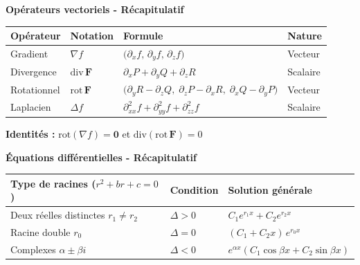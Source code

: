 \documentclass[11pt,a4paper]{article}
\begin{document}
\begin{methodebox}
\textbf{Opérateurs vectoriels - Récapitulatif}
\begin{center}
\begin{tabular}{@{}llll@{}}
\toprule
Opérateur & Notation & Formule & Nature \\
\midrule
Gradient   & $\nabla f$               & $\bigl(\partial_x f,\,\partial_y f,\,\partial_z f\bigr)$                                         & Vecteur \\[4pt]
Divergence & $\text{div}\,\mathbf{F}$ & $\partial_x P + \partial_y Q + \partial_z R$                                                    & Scalaire \\[4pt]
Rotationnel & $\text{rot}\,\mathbf{F}$ & $\bigl(\partial_y R - \partial_z Q,\;\partial_z P - \partial_x R,\;\partial_x Q - \partial_y P\bigr)$ & Vecteur \\[4pt]
Laplacien  & $\Delta f$               & $\partial^2_{xx} f + \partial^2_{yy} f + \partial^2_{zz} f$                                    & Scalaire \\
\bottomrule
\end{tabular}
\end{center}
\textbf{Identités :} $\text{rot}(\nabla f) = \mathbf{0}$ \quad et \quad $\text{div}(\text{rot}\,\mathbf{F}) = 0$
\end{methodebox}

\vspace{6pt}

\begin{methodebox}
\textbf{Équations différentielles - Récapitulatif}
\begin{center}
\begin{tabular}{@{}lll@{}}
\toprule
Type de racines ($r^2+br+c=0$) & Condition & Solution générale \\
\midrule
Deux réelles distinctes $r_1 \neq r_2$ & $\Delta > 0$ & $C_1 e^{r_1 x} + C_2 e^{r_2 x}$ \\[4pt]
Racine double $r_0$              & $\Delta = 0$ & $(C_1 + C_2 x)\,e^{r_0 x}$ \\[4pt]
Complexes $\alpha \pm \beta i$   & $\Delta < 0$ & $e^{\alpha x}(C_1\cos\beta x + C_2\sin\beta x)$ \\
\bottomrule
\end{tabular}
\end{center}
\end{methodebox}

\vspace{6pt}
\end{document}
